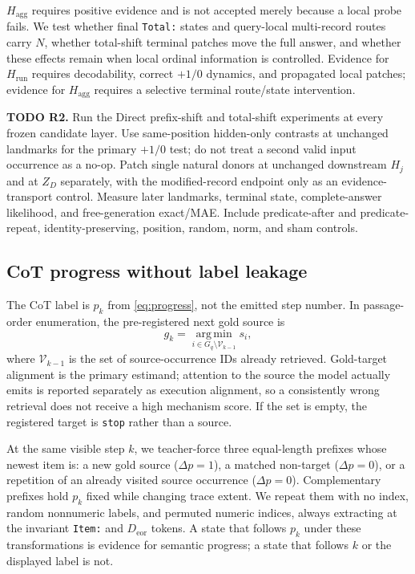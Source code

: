 \documentclass[10pt,twocolumn]{article}
\newcommand{\todoid}[2]{%
  \par\noindent\textcolor{red!75!black}{\textbf{TODO #1.} #2}\par}
\begin{document}
$H_{\mathrm{agg}}$ requires positive evidence and is not accepted merely because a local probe
fails. We test whether final \texttt{Total:} states and query-local multi-record routes carry
$N$, whether total-shift terminal patches move the full answer, and whether these effects remain
when local ordinal information is controlled. Evidence for $H_{\mathrm{run}}$ requires
decodability, correct $+1/0$ dynamics, and propagated local patches; evidence for
$H_{\mathrm{agg}}$ requires a selective terminal route/state intervention.

\todoid{R2}{Run the Direct prefix-shift and total-shift experiments at every frozen candidate
layer. Use same-position hidden-only contrasts at unchanged landmarks for the primary $+1/0$
test; do not treat a second valid input occurrence as a no-op. Patch single natural donors at
unchanged downstream $H_j$ and at $Z_D$ separately, with the modified-record endpoint only as an
evidence-transport control. Measure later landmarks, terminal state, complete-answer likelihood,
and free-generation exact/MAE. Include predicate-after and predicate-repeat,
identity-preserving, position, random, norm, and sham controls.}

\subsection{CoT progress without label leakage}
The CoT label is $p_k$ from \cref{eq:progress}, not the emitted step number. In passage-order
enumeration, the pre-registered next gold source is
\[
 g_k=\operatorname*{arg\,min}_{i\in G_q\setminus\mathcal V_{k-1}}s_i,
\]
where $\mathcal V_{k-1}$ is the set of source-occurrence IDs already retrieved. Gold-target
alignment is the primary estimand; attention to the source the model actually emits is reported
separately as execution alignment, so a consistently wrong retrieval does not receive a high
mechanism score. If the set is empty, the registered target is \texttt{stop} rather than a
source.

At the same visible step $k$, we teacher-force three equal-length prefixes whose newest item is:
a new gold source ($\Delta p=1$), a matched non-target ($\Delta p=0$), or a repetition of an
already visited source occurrence ($\Delta p=0$). Complementary prefixes hold $p_k$ fixed while
changing trace extent. We repeat them with no index, random nonnumeric labels, and permuted
numeric indices, always extracting at the invariant \texttt{Item:} and $D_{\mathrm{eor}}$
tokens. A state that follows $p_k$ under these transformations is evidence for semantic
progress; a state that follows $k$ or the displayed label is not.
\end{document}
